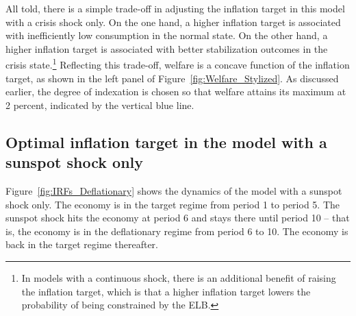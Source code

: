 \documentclass[11pt]{article}
\begin{document}
	
	All told, there is a simple trade-off in adjusting the inflation target in this model with a crisis shock only. On the one hand, a higher inflation target is associated with inefficiently low consumption in the normal state. On the other hand, a higher inflation target is associated with better stabilization outcomes in the crisis state.\footnote{In models with a continuous shock, there is an additional benefit of raising the inflation target, which is that a higher inflation target lowers the probability of being constrained by the ELB.} Reflecting this trade-off, welfare is a concave function of the inflation target, as shown in the left panel of Figure~\ref{fig:Welfare_Stylized}. As discussed earlier, the degree of indexation is chosen so that welfare attains its maximum at 2 percent, indicated by the vertical blue line.
	
	\subsection{Optimal inflation target in the model with a sunspot shock only}
	
	Figure~\ref{fig:IRFs_Deflationary} shows the dynamics of the model with a sunspot shock only. The economy is in the target regime from period 1 to period 5. The sunspot shock hits the economy at period 6 and stays there until period 10 -- that is, the economy is in the deflationary regime from period 6 to 10. The economy is back in the target regime thereafter. 
	
\end{document}
